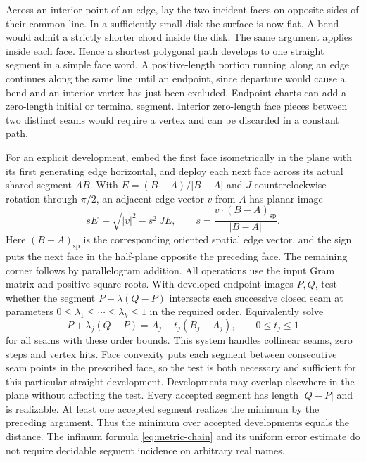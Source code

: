 \documentclass[10pt,letterpaper]{article}
\begin{document}
Across an interior point of an edge, lay the two incident faces on
opposite sides of their common line. In a sufficiently small disk the
surface is now flat. A bend would admit a strictly shorter chord inside
the disk. The same argument applies inside each face. Hence a shortest
polygonal path develops to one straight segment in a simple face word.
A positive-length portion running along an edge continues along the
same line until an endpoint, since departure would cause a bend and an
interior vertex has just been excluded. Endpoint charts can add a
zero-length initial or terminal segment. Interior zero-length face
pieces between two distinct seams would require a vertex and can be
discarded in a constant path.

For an explicit development, embed the first face isometrically in the
plane with its first generating edge horizontal, and deploy each next
face across its actual shared segment $AB$. With
$E=(B-A)/|B-A|$ and $J$ counterclockwise rotation through $\pi/2$,
an adjacent edge vector $v$ from $A$ has planar image
\[
   sE\ \mathbin{\pm}\sqrt{|v|^2-s^2}\,JE,\qquad
   s=\frac{v\cdot (B-A)_{\mathrm{sp}}}{|B-A|}.
\]
Here $(B-A)_{\mathrm{sp}}$ is the corresponding oriented spatial edge
vector, and the sign puts the next face in the half-plane opposite
the preceding face. The remaining corner follows by parallelogram
addition. All operations use the input Gram matrix and positive square
roots. With developed endpoint images $P,Q$, test whether the segment
$P+\lambda(Q-P)$ intersects each successive closed seam at parameters
$0\le\lambda_1\le\cdots\le\lambda_k\le1$ in the required order.
Equivalently solve
\[
   P+\lambda_j(Q-P)=A_j+t_j(B_j-A_j),\qquad 0\le t_j\le1
\]
for all seams with these order bounds. This system handles collinear
seams, zero steps and vertex hits. Face convexity puts each segment
between consecutive seam points in the prescribed face, so the test is
both necessary and sufficient for this particular straight development.
Developments may overlap elsewhere in the plane without affecting
the test. Every accepted segment has length $|Q-P|$ and is realizable.
At least one accepted segment realizes the minimum by the preceding
argument. Thus the minimum over accepted developments equals the
distance. The infimum formula \eqref{eq:metric-chain} and its uniform
error estimate do not require decidable segment incidence on arbitrary
real names.
\end{document}
